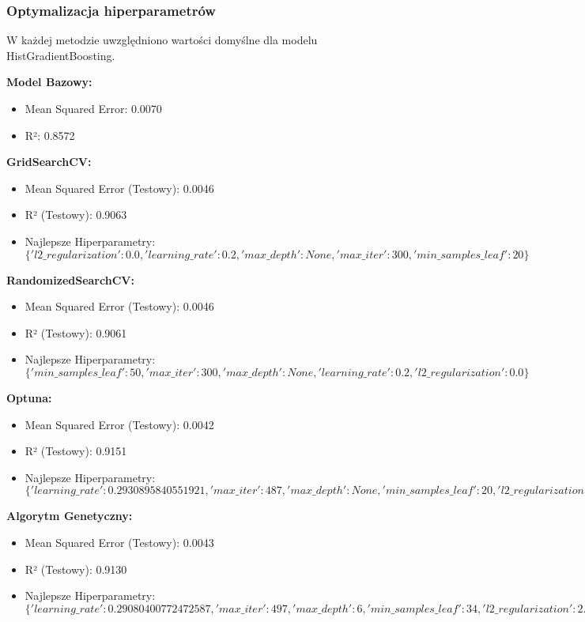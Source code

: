 \documentclass[10pt,letterpaper]{article}
\begin{document}
	
	\subsubsection{Optymalizacja hiperparametrów}
	W każdej metodzie uwzględniono wartości domyślne dla modelu HistGradientBoosting.
	
	\textbf{Model Bazowy:} 
	\begin{itemize}
		\item Mean Squared Error: 0.0070
		\item R²: 0.8572
	\end{itemize}
	
	\textbf{GridSearchCV:} 
	\begin{itemize}
		\item Mean Squared Error (Testowy): 0.0046
		\item R² (Testowy): 0.9063
		\item Najlepsze Hiperparametry: $\{ 'l2\_regularization': 0.0, 'learning\_rate': 0.2, 'max\_depth': None, 'max\_iter': 300, 'min\_samples\_leaf': 20 \}$
	\end{itemize}
	
	\textbf{RandomizedSearchCV:} 
	\begin{itemize}
		\item Mean Squared Error (Testowy): 0.0046
		\item R² (Testowy): 0.9061
		\item Najlepsze Hiperparametry: $\{ 'min\_samples\_leaf': 50, 'max\_iter': 300, 'max\_depth': None, 'learning\_rate': 0.2, 'l2\_regularization': 0.0 \}$
	\end{itemize}
	
	\textbf{Optuna:} 
	\begin{itemize}
		\item Mean Squared Error (Testowy): 0.0042
		\item R² (Testowy): 0.9151
		\item Najlepsze Hiperparametry: $\{ 'learning\_rate': 0.2930895840551921, 'max\_iter': 487, 'max\_depth': None, 'min\_samples\_leaf': 20, 'l2\_regularization': 3.941533331112236 \}$
	\end{itemize}
	
	\textbf{Algorytm Genetyczny:} 
	\begin{itemize}
		\item Mean Squared Error (Testowy): 0.0043
		\item R² (Testowy): 0.9130
		\item Najlepsze Hiperparametry: $\{ 'learning\_rate': 0.29080400772472587, 'max\_iter': 497, 'max\_depth': 6, 'min\_samples\_leaf': 34, 'l2\_regularization': 2.30621555056688 \}$
	\end{itemize}
	
\end{document}
